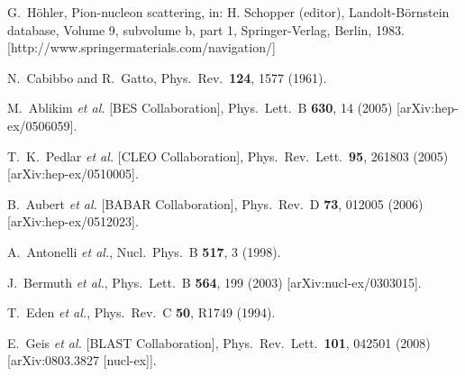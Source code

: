 \documentclass[12pt]{article}
\begin{document}
\begin{thebibliography}{99}
G.~H\"{o}hler, Pion-nucleon scattering, 
in: H. Schopper (editor), Landolt-B\"ornstein database, 
Volume 9, subvolume b, part 1, Springer-Verlag, Berlin, 1983. 
[http://www.springermaterials.com/navigation/]

 N.~Cabibbo and R.~Gatto,
 Phys.\ Rev.\  {\bf 124}, 1577 (1961).

  M.~Ablikim {\it et al.}  [BES Collaboration],
  Phys.\ Lett.\  B {\bf 630}, 14 (2005)
  [arXiv:hep-ex/0506059].

  T.~K.~Pedlar {\it et al.}  [CLEO Collaboration],
  Phys.\ Rev.\ Lett.\  {\bf 95}, 261803 (2005)
  [arXiv:hep-ex/0510005].

  B.~Aubert {\it et al.}  [BABAR Collaboration],
  Phys.\ Rev.\  D {\bf 73}, 012005 (2006)
  [arXiv:hep-ex/0512023].

  A.~Antonelli {\it et al.},
  Nucl.\ Phys.\  B {\bf 517}, 3 (1998).

  J.~Bermuth {\it et al.},
  Phys.\ Lett.\  B {\bf 564}, 199 (2003)
  [arXiv:nucl-ex/0303015].

  T.~Eden {\it et al.},
  Phys.\ Rev.\  C {\bf 50}, R1749 (1994).

  E.~Geis {\it et al.}  [BLAST Collaboration],
  Phys.\ Rev.\ Lett.\  {\bf 101}, 042501 (2008)
  [arXiv:0803.3827 [nucl-ex]].


\end{thebibliography}
\end{document}

